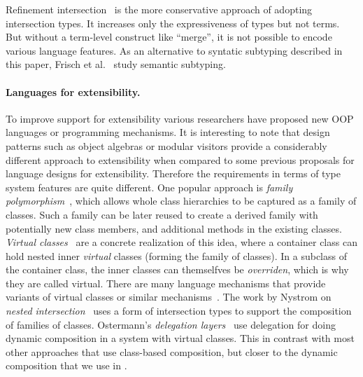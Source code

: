 
Refinement
intersection~\cite{dunfield2007refined,davies2005practical,freeman1991refinement}
is the more conservative approach of adopting intersection types. It increases
only the expressiveness of types but not terms. But without a term-level
construct like ``merge'', it is not possible to encode various language
features. As an alternative to syntatic subtyping described in this paper,
Frisch et al.~\cite{frisch2008semantic} study semantic subtyping.

\paragraph{Languages for extensibility.}
To improve support for extensibility various researchers have proposed
new OOP languages or programming mechanisms. It is interesting to
note that design patterns such as object algebras or modular visitors
provide a considerably different approach to extensibility when
compared to some previous proposals for language designs for
extensibility. Therefore the requirements in terms of type system
features are quite different.  One popular approach is \emph{family
  polymorphism}~\cite{Ernst01family}, which allows whole class hierarchies to be
captured as a family of classes. Such a family can be later reused to
create a derived family with potentially new class members, and
additional methods in the existing classes.  \emph{Virtual
  classes}~\cite{ernst2006virtual} are a concrete realization of this idea, where a
container class can hold nested inner \emph{virtual} classes (forming
the family of classes). In a subclass of the container class, the
inner classes can themselfves be \emph{overriden}, which is why they
are called virtual. There are many language mechanisms that provide
variants of virtual classes or similar mechanisms~\cite{McDirmid01Jiazzi,Aracic06CaesarJ,Smaragdakis98mixin,nystrom2006j}. The work by 
Nystrom on \emph{nested intersection}~\cite{nystrom2006j} uses a
form of intersection types to support the composition of
families of classes. Ostermann's \emph{delegation layers}~\cite{Ostermann02dynamically}
use delegation for doing dynamic composition in a system 
with virtual classes. This in contrast with most other approaches 
that use class-based composition, but closer to the dynamic
composition that we use in \name.

